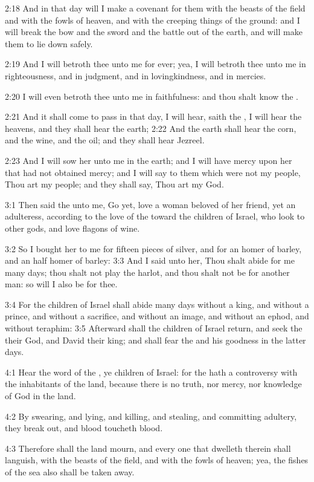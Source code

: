 2:18 And in that day will I make a covenant for them with the beasts
of the field and with the fowls of heaven, and with the creeping
things of the ground: and I will break the bow and the sword and the
battle out of the earth, and will make them to lie down safely.

2:19 And I will betroth thee unto me for ever; yea, I will betroth
thee unto me in righteousness, and in judgment, and in lovingkindness,
and in mercies.

2:20 I will even betroth thee unto me in faithfulness: and thou shalt
know the \LORD.

2:21 And it shall come to pass in that day, I will hear, saith the
\LORD, I will hear the heavens, and they shall hear the earth; 2:22 And
the earth shall hear the corn, and the wine, and the oil; and they
shall hear Jezreel.

2:23 And I will sow her unto me in the earth; and I will have mercy
upon her that had not obtained mercy; and I will say to them which
were not my people, Thou art my people; and they shall say, Thou art
my God.

3:1 Then said the \LORD unto me, Go yet, love a woman beloved of her
friend, yet an adulteress, according to the love of the \LORD toward
the children of Israel, who look to other gods, and love flagons of
wine.

3:2 So I bought her to me for fifteen pieces of silver, and for an
homer of barley, and an half homer of barley: 3:3 And I said unto her,
Thou shalt abide for me many days; thou shalt not play the harlot, and
thou shalt not be for another man: so will I also be for thee.

3:4 For the children of Israel shall abide many days without a king,
and without a prince, and without a sacrifice, and without an image,
and without an ephod, and without teraphim: 3:5 Afterward shall the
children of Israel return, and seek the \LORD their God, and David
their king; and shall fear the \LORD and his goodness in the latter
days.

4:1 Hear the word of the \LORD, ye children of Israel: for the \LORD
hath a controversy with the inhabitants of the land, because there is
no truth, nor mercy, nor knowledge of God in the land.

4:2 By swearing, and lying, and killing, and stealing, and committing
adultery, they break out, and blood toucheth blood.

4:3 Therefore shall the land mourn, and every one that dwelleth
therein shall languish, with the beasts of the field, and with the
fowls of heaven; yea, the fishes of the sea also shall be taken away.


